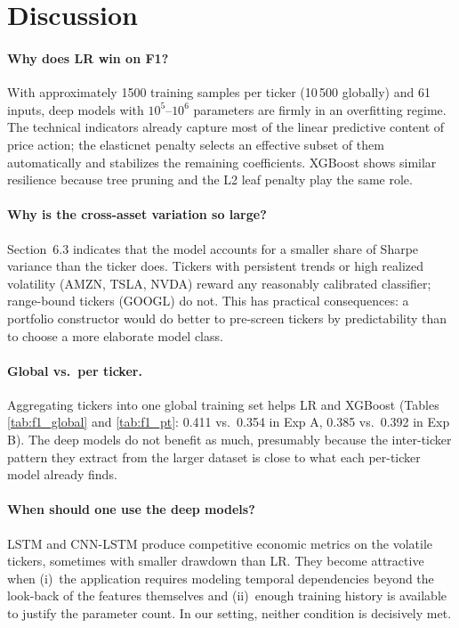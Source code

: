 \documentclass[runningheads]{llncs}
\begin{document}
\section{Discussion}
\label{sec:discussion}

\paragraph{Why does LR win on F1?}
With approximately 1500 training samples per ticker (10\,500 globally) and 61 inputs, deep models with $10^5$--$10^6$ parameters are firmly in an overfitting regime. The technical indicators already capture most of the linear predictive content of price action; the elasticnet penalty selects an effective subset of them automatically and stabilizes the remaining coefficients. XGBoost shows similar resilience because tree pruning and the L2 leaf penalty play the same role.

\paragraph{Why is the cross-asset variation so large?}
Section~6.3 indicates that the model accounts for a smaller share of Sharpe variance than the ticker does. Tickers with persistent trends or high realized volatility (AMZN, TSLA, NVDA) reward any reasonably calibrated classifier; range-bound tickers (GOOGL) do not. This has practical consequences: a portfolio constructor would do better to pre-screen tickers by predictability than to choose a more elaborate model class.

\paragraph{Global vs.\ per ticker.}
Aggregating tickers into one global training set helps LR and XGBoost (Tables \ref{tab:f1_global} and \ref{tab:f1_pt}: 0.411 vs.\ 0.354 in Exp A, 0.385 vs.\ 0.392 in Exp B). The deep models do not benefit as much, presumably because the inter-ticker pattern they extract from the larger dataset is close to what each per-ticker model already finds.

\paragraph{When should one use the deep models?}
LSTM and CNN-LSTM produce competitive economic metrics on the volatile tickers, sometimes with smaller drawdown than LR. They become attractive when (i)~the application requires modeling temporal dependencies beyond the look-back of the features themselves and (ii)~enough training history is available to justify the parameter count. In our setting, neither condition is decisively met.
\end{document}
